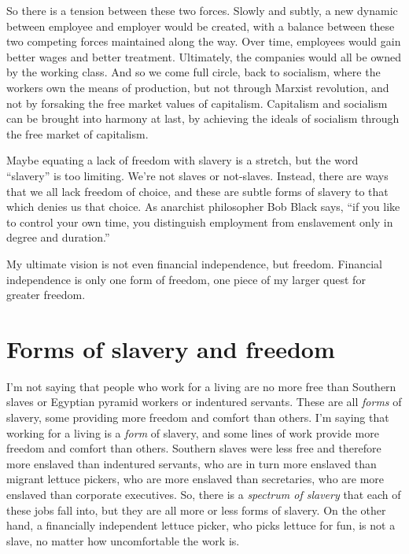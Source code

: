 So there is a tension between these two forces. Slowly and subtly, a new dynamic between employee and employer would be created, with a balance between these two competing forces maintained along the way. Over time, employees would gain better wages and better treatment. Ultimately, the companies would all be owned by the working class. And so we come full circle, back to socialism, where the workers own the means of production, but not through Marxist revolution, and not by forsaking the free market values of capitalism. Capitalism and socialism can be brought into harmony at last, by achieving the ideals of socialism through the free market of capitalism.

Maybe equating a lack of freedom with slavery is a stretch, but the word ``slavery'' is too limiting. We're not slaves or not-slaves. Instead, there are ways that we all lack freedom of choice, and these are subtle forms of slavery to that which denies us that choice. As anarchist philosopher Bob Black says, ``if you like to control your own time, you distinguish employment from enslavement only in degree and duration.''

My ultimate vision is not even financial independence, but freedom. Financial independence is only one form of freedom, one piece of my larger quest for greater freedom.

\section{Forms of slavery and freedom}
I'm not saying that people who work for a living are no more free than Southern slaves or Egyptian pyramid workers or indentured servants. These are all \emph{forms} of slavery, some providing more freedom and comfort than others. I'm saying that working for a living is a \emph{form} of slavery, and some lines of work provide more freedom and comfort than others. Southern slaves were less free and therefore more enslaved than indentured servants, who are in turn more enslaved than migrant lettuce pickers, who are more enslaved than secretaries, who are more enslaved than corporate executives. So, there is a \emph{spectrum of slavery} that each of these jobs fall into, but they are all more or less forms of slavery. On the other hand, a financially independent lettuce picker, who picks lettuce for fun, is not a slave, no matter how uncomfortable the work is.

